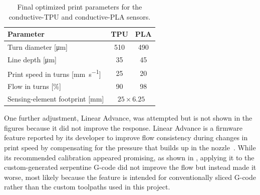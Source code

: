 \begin{table}
\centering
\caption{Final optimized print parameters for the conductive-TPU and conductive-PLA sensors.}
\label{tab:opt_params}
\begin{tabular}{@{}l c c@{}}
\toprule
Parameter & TPU & PLA \\
\midrule
Turn diameter [\si{\micro\meter}]            & 510 & 490 \\
Line depth [\si{\micro\meter}]               & 35 & 45 \\
Print speed in turns [\si{\milli\meter\per\second}] & 25 & 20 \\
Flow in turns [\si{\percent}]                & 90 & 98 \\
\midrule
Sensing-element footprint [\si{\milli\meter}]        & \multicolumn{2}{c}{$25 \times 6.25$} \\
\bottomrule
\end{tabular}
\end{table}

One further adjustment, Linear Advance, was attempted but is not shown in the figures because it did not improve the response. Linear Advance is a firmware feature reported by its developer to improve flow consistency during changes in print speed by compensating for the pressure that builds up in the nozzle~\cite{Lin_adv}. While its recommended calibration appeared promising, as shown in , applying it to the custom-generated serpentine G-code did not improve the flow but instead made it worse, most likely because the feature is intended for conventionally sliced G-code rather than the custom toolpaths used in this project.


